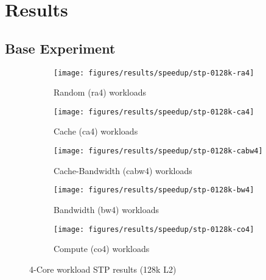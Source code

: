 
\chapter{Results}
\label{cpt:results}

\section{Base Experiment}
\begin{figure}
    \centering
    \begin{subfigure}[b]{\textwidth}
            \texttt{[image: figures/results/speedup/stp-0128k-ra4]}
            \caption{Random (ra4) workloads}
            \label{fig:results:4core:stp:random}
    \end{subfigure}

    \begin{subfigure}[b]{0.5\textwidth}
            \texttt{[image: figures/results/speedup/stp-0128k-ca4]}
            \caption{Cache (ca4) workloads}
            \label{fig:results:4core:stp:cache}
    \end{subfigure}%
    \begin{subfigure}[b]{0.5\textwidth}
            \texttt{[image: figures/results/speedup/stp-0128k-cabw4]}
            \caption{Cache-Bandwidth (cabw4) workloads}
            \label{fig:results:4core:stp:cache-bw}
    \end{subfigure}

    \begin{subfigure}[b]{0.5\textwidth}
            \texttt{[image: figures/results/speedup/stp-0128k-bw4]}
            \caption{Bandwidth (bw4) workloads}
            \label{fig:results:4core:stp:bw}
    \end{subfigure}%
    \begin{subfigure}[b]{0.5\textwidth}
            \texttt{[image: figures/results/speedup/stp-0128k-co4]}
            \caption{Compute (co4) workloads}
            \label{fig:results:4core:stp:co}
    \end{subfigure}%

    \caption{4-Core workload STP results (128k L2)}\label{fig:results:4core:stp}
\end{figure}

